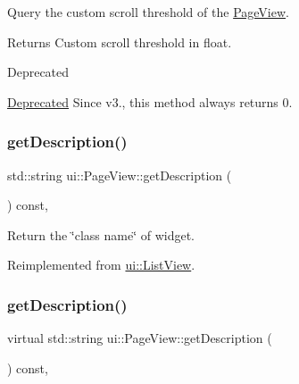 Query the custom scroll threshold of the \hyperlink{classui_1_1PageView}{Page\+View}. 

\begin{DoxyReturn}{Returns}
Custom scroll threshold in float. 
\end{DoxyReturn}
\begin{DoxyRefDesc}{Deprecated}
\item[\hyperlink{deprecated__deprecated000387}{Deprecated}]Since v3., this method always returns 0. \end{DoxyRefDesc}
\mbox{\label{classui_1_1PageView_a3c9b2934fdbbb44e2c456feee27b53de}} 
\subsubsection{\texorpdfstring{get\+Description()}{getDescription()}\hspace{0.1cm}{\footnotesize\ttfamily [1/2]}}
{\footnotesize\ttfamily std\+::string ui\+::\+Page\+View\+::get\+Description (\begin{DoxyParamCaption}{ }\end{DoxyParamCaption}) const\hspace{0.3cm}{\ttfamily [override]}, {\ttfamily [virtual]}}

Return the \char`\"{}class name\char`\"{} of widget. 

Reimplemented from \hyperlink{classui_1_1ListView_a653bb454095ef227949f7c791b68180c}{ui\+::\+List\+View}.

\mbox{\label{classui_1_1PageView_aead0575c0e5d24da3731501afadf81e9}} 
\subsubsection{\texorpdfstring{get\+Description()}{getDescription()}\hspace{0.1cm}{\footnotesize\ttfamily [2/2]}}
{\footnotesize\ttfamily virtual std\+::string ui\+::\+Page\+View\+::get\+Description (\begin{DoxyParamCaption}{ }\end{DoxyParamCaption}) const\hspace{0.3cm}{\ttfamily [override]}, {\ttfamily [virtual]}}

